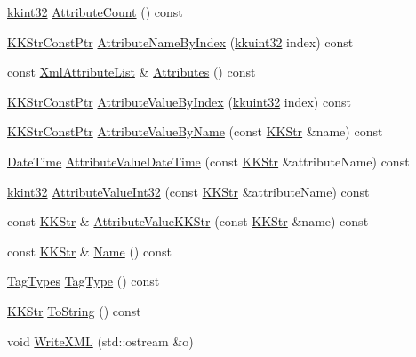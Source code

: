\begin{DoxyCompactItemize}
\item 
\hyperlink{namespace_k_k_b_a8fa4952cc84fda1de4bec1fbdd8d5b1b}{kkint32} \hyperlink{class_k_k_b_1_1_xml_tag_a10f5b347fa9da308939c0ac21f070730}{Attribute\+Count} () const 
\item 
\hyperlink{namespace_k_k_b_a46f665ec17615c856eff3d21f78bed5c}{K\+K\+Str\+Const\+Ptr} \hyperlink{class_k_k_b_1_1_xml_tag_a61ba0499cfa68b1197fea386a1274383}{Attribute\+Name\+By\+Index} (\hyperlink{namespace_k_k_b_af8d832f05c54994a1cce25bd5743e19a}{kkuint32} index) const 
\item 
const \hyperlink{class_k_k_b_1_1_xml_attribute_list}{Xml\+Attribute\+List} \& \hyperlink{class_k_k_b_1_1_xml_tag_a6c095b447cf9bb12ebddd4136c173ab8}{Attributes} () const 
\item 
\hyperlink{namespace_k_k_b_a46f665ec17615c856eff3d21f78bed5c}{K\+K\+Str\+Const\+Ptr} \hyperlink{class_k_k_b_1_1_xml_tag_a3bb39487ecf34a319b027b7ab0bfc83e}{Attribute\+Value\+By\+Index} (\hyperlink{namespace_k_k_b_af8d832f05c54994a1cce25bd5743e19a}{kkuint32} index) const 
\item 
\hyperlink{namespace_k_k_b_a46f665ec17615c856eff3d21f78bed5c}{K\+K\+Str\+Const\+Ptr} \hyperlink{class_k_k_b_1_1_xml_tag_a0470baf5a49af1c2f6aaf0155b9ba783}{Attribute\+Value\+By\+Name} (const \hyperlink{class_k_k_b_1_1_k_k_str}{K\+K\+Str} \&name) const 
\item 
\hyperlink{class_k_k_b_1_1_date_time}{Date\+Time} \hyperlink{class_k_k_b_1_1_xml_tag_a0281ac91c0d271ac3b9cbe4738d5ad12}{Attribute\+Value\+Date\+Time} (const \hyperlink{class_k_k_b_1_1_k_k_str}{K\+K\+Str} \&attribute\+Name) const 
\item 
\hyperlink{namespace_k_k_b_a8fa4952cc84fda1de4bec1fbdd8d5b1b}{kkint32} \hyperlink{class_k_k_b_1_1_xml_tag_acbbfaeaf55fd15e4f563a71a1b4fa456}{Attribute\+Value\+Int32} (const \hyperlink{class_k_k_b_1_1_k_k_str}{K\+K\+Str} \&attribute\+Name) const 
\item 
const \hyperlink{class_k_k_b_1_1_k_k_str}{K\+K\+Str} \& \hyperlink{class_k_k_b_1_1_xml_tag_a70aa928e7fecc15e7a510e23a5d30920}{Attribute\+Value\+K\+K\+Str} (const \hyperlink{class_k_k_b_1_1_k_k_str}{K\+K\+Str} \&name) const 
\item 
const \hyperlink{class_k_k_b_1_1_k_k_str}{K\+K\+Str} \& \hyperlink{class_k_k_b_1_1_xml_tag_a80934a69d86c1e06b13889fcde99a63b}{Name} () const 
\item 
\hyperlink{class_k_k_b_1_1_xml_tag_a6c0ef0e23f982f49d55d4fb7eaff6ac9}{Tag\+Types} \hyperlink{class_k_k_b_1_1_xml_tag_abe56f7d7b736e627d3a9a584ff965b1e}{Tag\+Type} () const 
\item 
\hyperlink{class_k_k_b_1_1_k_k_str}{K\+K\+Str} \hyperlink{class_k_k_b_1_1_xml_tag_ac2edd74085cdd50465096426f1ef9e44}{To\+String} () const 
\item 
void \hyperlink{class_k_k_b_1_1_xml_tag_a0ba9ea780e48285cbcd0ecac787a4012}{Write\+X\+ML} (std\+::ostream \&o)
\end{DoxyCompactItemize}



